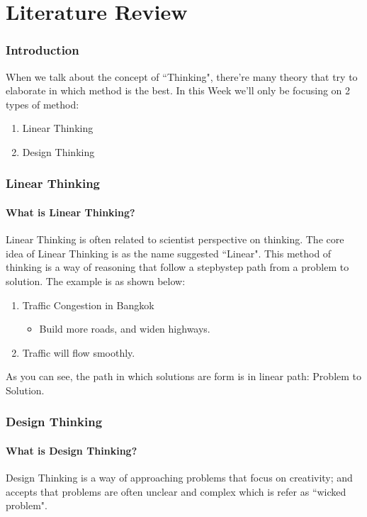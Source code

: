 \documentclass[11pt, twocolumn]{article}
\begin{document}

\part{Literature Review}
	\section{Introduction}
		When we talk about the concept of ``Thinking", there're many theory that try to elaborate in which method is the best. In this Week we'll only be focusing on 2 types of method:
		\begin{enumerate}
			\item Linear Thinking
			\item Design Thinking
		\end{enumerate}
	
	\section{Linear Thinking}
		\subsection{What is Linear Thinking?}
			Linear Thinking is often related to scientist perspective on thinking. The core idea of Linear Thinking is as the name suggested ``Linear".
			This method of thinking is a way of reasoning that follow a step\textendash by\textendash step path from a problem to solution. The example is as shown below:
				\begin{enumerate}
					\item Traffic Congestion in Bangkok
						\begin{itemize}
							\item Build more roads, and widen highways.
						\end{itemize}
					\item Traffic will flow smoothly.
				\end{enumerate}
			As you can see, the path in which solutions are form is in linear path: Problem to Solution.
	
	\section{Design Thinking}
		\subsection{What is Design Thinking?}
			Design Thinking is a way of approaching problems that focus on creativity; and accepts that problems are often unclear and complex which is refer as ``wicked problem".
\end{document}
